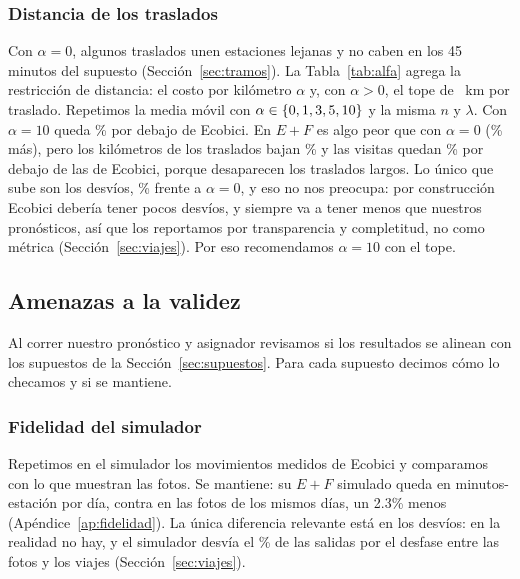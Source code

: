 \documentclass[conference,letterpaper,10pt]{IEEEtran}
\newcommand{\EF}{E+F}
\begin{document}
\subsubsection{Distancia de los traslados}\label{sec:resultados_alfa}
Con $\alpha=0$, algunos traslados unen estaciones lejanas y no caben en los 45 minutos del supuesto (Sección~\ref{sec:tramos}). La Tabla~\ref{tab:alfa} agrega la restricción de distancia: el costo por kilómetro $\alpha$ y, con $\alpha>0$, el tope de \tfLimKm~km por traslado. Repetimos la media móvil con $\alpha\in\{0, 1, 3, 5, 10\}$ y la misma $n$ y $\lambda$. Con $\alpha=10$ queda \caDiezEco\% por debajo de Ecobici. En $\EF$ es algo peor que con $\alpha=0$ (\caDiezEF\% más), pero los kilómetros de los traslados bajan \caDiezKm\% y las visitas quedan \caDiezVisEco\% por debajo de las de Ecobici, porque desaparecen los traslados largos. Lo único que sube son los desvíos, \caDiezDesv\% frente a $\alpha=0$, y eso no nos preocupa: por construcción Ecobici debería tener pocos desvíos, y siempre va a tener menos que nuestros pronósticos, así que los reportamos por transparencia y completitud, no como métrica (Sección~\ref{sec:viajes}). Por eso recomendamos $\alpha=10$ con el tope.

\subsection{Amenazas a la validez}\label{sec:amenazas}
Al correr nuestro pronóstico y asignador revisamos si los resultados se alinean con los supuestos de la Sección~\ref{sec:supuestos}. Para cada supuesto decimos cómo lo checamos y si se mantiene.

\subsubsection{Fidelidad del simulador}\label{sec:fidelidad}
Repetimos en el simulador los movimientos medidos de Ecobici y comparamos con lo que muestran las fotos. Se mantiene: su $\EF$ simulado queda en \recoEF{} minutos-estación por día, contra \rfdFeedEF{} en las fotos de los mismos \rdias{} días, un 2.3\% menos (Apéndice~\ref{ap:fidelidad}). La única diferencia relevante está en los desvíos: en la realidad no hay, y el simulador desvía el \recoDesvPct\% de las salidas por el desfase entre las fotos y los viajes (Sección~\ref{sec:viajes}).
\end{document}
